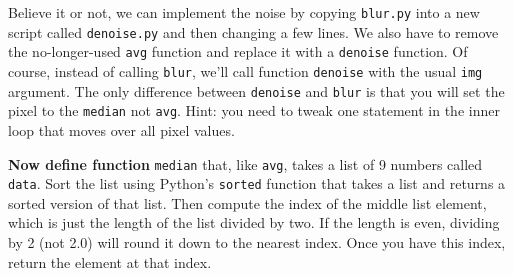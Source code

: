 Believe it or not, we can implement the noise by copying {\tt blur.py} into a new script called {\tt denoise.py} and then changing a few lines.  We also have to remove the  no-longer-used {\tt avg} function and replace it with a {\tt denoise} function.  Of course, instead of calling {\tt blur}, we'll call function {\tt denoise} with the usual {\tt img} argument. The only difference between {\tt denoise} and {\tt blur} is that you will set the pixel to the {\tt median} not {\tt avg}.  Hint: you need to tweak one statement in the inner loop that moves over all pixel values.

{\bf Now define function} {\tt median} that, like {\tt avg}, takes a list of 9 numbers called {\tt data}. Sort the list using Python's {\tt sorted} function that takes a list and returns a sorted version of that list. Then compute the index of the middle list element, which is just the length of the list divided by two. If the length is even, dividing by 2 (not 2.0) will round it down to the nearest index. Once you have this index, return the element at that index.

